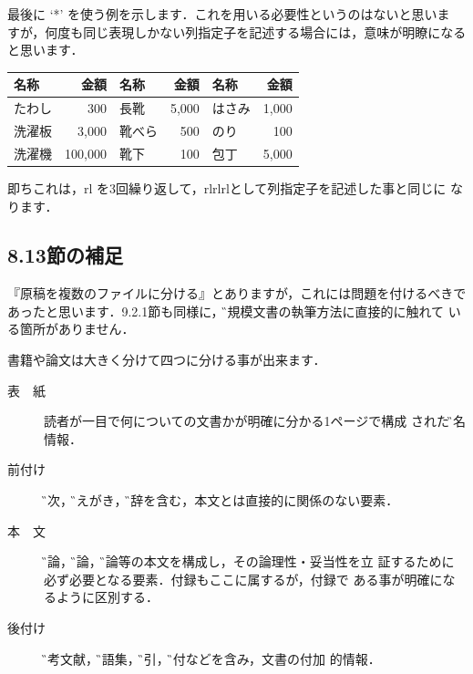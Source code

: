 最後に `*' を使う例を示します．これを用いる必要性というのはないと思いま
すが，何度も同じ表現しかない列指定子を記述する場合には，意味が明瞭になる
と思います．

\begin{example}
 \begin{tabular}{|*{3}{lr|}}
  \hline
  名称 & 金額 & 名称 & 金額 & 名称 & 金額 \\
  \hline
  たわし & 300 & 長靴 & 5,000 & はさみ & 1,000\\
  洗濯板 & 3,000 & 靴べら & 500 & のり & 100\\
  洗濯機 & 100,000 & 靴下 & 100 & 包丁 & 5,000\\
  \hline
 \end{tabular}
\end{example}

即ちこれは，rl を3回繰り返して，rlrlrlとして列指定子を記述した事と同じに
なります．

\subsection{8.13節の補足}

『原稿を複数のファイルに分ける』とありますが，これには問題を付けるべきで
あったと思います．9.2.1節も同様に，\G{大規模文書}の執筆方法に直接的に触れて
いる箇所がありません．

書籍や論文は大きく分けて四つに分ける事が出来ます．
\begin{description}
 \item[表　紙]   読者が一目で何についての文書かが明確に分かる1ページで構成
	    された\G{題名}情報．
 \item[前付け] \G{目次}，\G{まえがき}，\G{謝辞}を含む，本文とは直接的に関係のない要素．
 \item[本　文]   \G{序論}，\G{本論}，\G{結論}等の本文を構成し，その論理性・妥当性を立
	    証するために必ず必要となる要素．付録もここに属するが，付録で
	    ある事が明確になるように区別する．
 \item[後付け] \G{参考文献}，\G{用語集}，\G{索引}，\G{奥付}などを含み，文書の付加
	    的情報．
\end{description}

